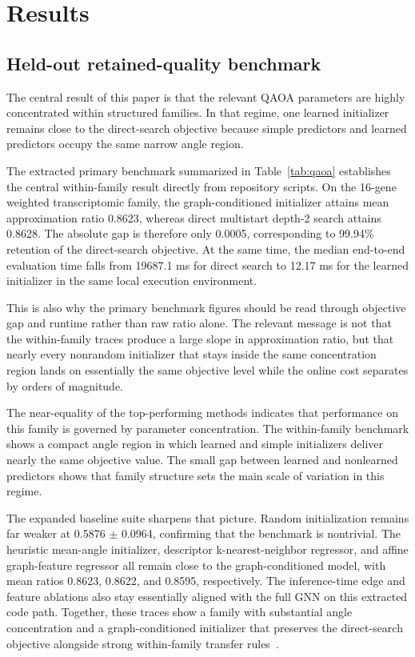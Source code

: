 \documentclass[
  reprint,
  twocolumn,
  aps,
  superscriptaddress,
  longbibliography,
  floatfix
]{revtex4-2}
\begin{document}
\section{Results}
\subsection{Held-out retained-quality benchmark}
The central result of this paper is that the relevant QAOA parameters are highly concentrated within structured families. In that regime, one learned initializer remains close to the direct-search objective because simple predictors and learned predictors occupy the same narrow angle region.

The extracted primary benchmark summarized in Table~\ref{tab:qaoa} establishes the central within-family result directly from repository scripts. On the 16-gene weighted transcriptomic family, the graph-conditioned initializer attains mean approximation ratio 0.8623, whereas direct multistart depth-2 search attains 0.8628. The absolute gap is therefore only 0.0005, corresponding to 99.94\% retention of the direct-search objective. At the same time, the median end-to-end evaluation time falls from 19687.1 ms for direct search to 12.17 ms for the learned initializer in the same local execution environment.

This is also why the primary benchmark figures should be read through objective gap and runtime rather than raw ratio alone. The relevant message is not that the within-family traces produce a large slope in approximation ratio, but that nearly every nonrandom initializer that stays inside the same concentration region lands on essentially the same objective level while the online cost separates by orders of magnitude.

The near-equality of the top-performing methods indicates that performance on this family is governed by parameter concentration. The within-family benchmark shows a compact angle region in which learned and simple initializers deliver nearly the same objective value. The small gap between learned and nonlearned predictors shows that family structure sets the main scale of variation in this regime.

The expanded baseline suite sharpens that picture. Random initialization remains far weaker at 0.5876 $\pm$ 0.0964, confirming that the benchmark is nontrivial. The heuristic mean-angle initializer, descriptor k-nearest-neighbor regressor, and affine graph-feature regressor all remain close to the graph-conditioned model, with mean ratios 0.8623, 0.8622, and 0.8595, respectively. The inference-time edge and feature ablations also stay essentially aligned with the full GNN on this extracted code path. Together, these traces show a family with substantial angle concentration and a graph-conditioned initializer that preserves the direct-search objective alongside strong within-family transfer rules~\cite{akshay2021,gorishniy2021}.
\end{document}
